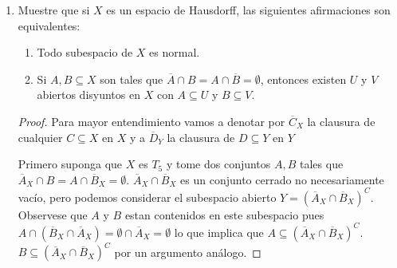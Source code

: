 \documentclass[paper=letter, fontsize=11pt]{scrartcl} %
\numberwithin{equation}{section} %
\numberwithin{figure}{section} %
\numberwithin{table}{section} %
\begin{document}
\begin{enumerate}
\begin{proof}
Ahora solo resta demostrar que si tenemos que $ |A|\leq |\mathbb{R}|= 2^{\aleph_0} $ entonces también podemos construir un conjunto denso enumerable.

Ahora vamos a demostrar un teorema que nos puede resultar util. Si $ X $ es un espacio separable y tenemos una función sobreyectiva continua $ f: X \to Y $ entonces Y es separable. Si $ D $ es el denso enumerable de $ X $ entonces $ f(D) $ es el denso enumerable de $ Y $. En primer lugar es enumerable porque $ |f(D)|\leq |D| = \aleph_0 $. Además si tomamos cualquier abierto $ U $ en $ Y $ su preimagen $ f^{-1}(U) $ es un abierto en $ X $, pero como $ D $ es denso existe un $ d \in D $ tal que $ d \in f{-1}(U) $. Luego $ f(d) \in f(D) \cap U $ con lo que probamos que es denso.

Ahora volviendo a nuestro problema, nuestra hipotesis indica que existe una inyección $ i:A \to \mathbb{R} $ y entonces considere $ i(A) $ la imagen de $ A $ en $ \mathbb{R} $ y observe que $ [0,1]^A \cong [0,1]^{i(A)} $. Entonces tome como función continua $ g: [0,1]^\mathbb{R}\to [0,1]^{i(A)} $ la función tal que $ f \mapsto f\upharpoonright_{i(A)} $. Esta función es continua porque para cualquier abierto en $ [0,1]^{i(A)} $ que son restricciones finitas sobre las coordenadas su preimagen también es el conjunto de funciones restrigidas en las mismas finitas coordenadas y por lo tanto también es abierto en $ [0,1]^\mathbb{R} $. Por lo tanto, por el teorema anterior $ [0,1]^A $ también es separable
\end{proof}

\item Muestre que si $ X $ es un espacio de Hausdorff, las siguientes afirmaciones son equivalentes:
\begin{enumerate}
\item Todo subespacio de $ X $ es normal.
\item Si $ A,B \subseteq X $ son tales que $ \overline{A}\cap B = A \cap \overline{B}=\emptyset $, entonces existen $ U $ y $ V $ abiertos disyuntos en $ X $ con $ A \subseteq U $ y $ B \subseteq V $.

\end{enumerate}

\begin{proof}

Para mayor entendimiento vamos a denotar por $ \overline{C}_X $ la clausura de cualquier $ C \subseteq X $ en $ X $ y a $ \overline{D}_Y $ la clausura de $ D \subseteq Y $ en $ Y $

Primero suponga que $ X $ es $ T_5 $ y tome dos conjuntos $ A, B $ tales que  $ \overline{A}_X\cap B = A \cap \overline{B}_X=\emptyset $.  $ \overline{A}_X \cap \overline{B}_X $ es un conjunto cerrado no necesariamente vacío, pero podemos considerar el subespacio abierto $ Y =  (\overline{A}_X \cap \overline{B}_X)^C $. Observese que $ A $ y $ B $ estan contenidos en este subespacio pues $ A \cap (\overline{B}_X \cap \overline{A}_X) = \emptyset \cap \overline{A}_X = \emptyset $ lo que implica que $ A \subseteq (\overline{A}_X \cap \overline{B}_X)^C  $. $ B \subseteq (\overline{A}_X \cap \overline{B}_X)^C $ por un argumento análogo.


\end{proof}
\end{enumerate}
\end{document}
